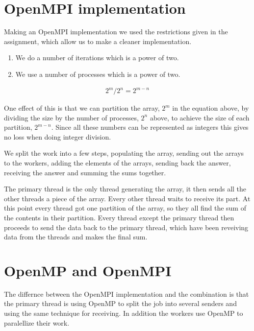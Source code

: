 \section{OpenMPI implementation }
Making an OpenMPI implementation we used the restrictions given in the assignment, which allow us to make a cleaner implementation. 

\begin{enumerate}

\item We do a number of iterations which is a power of two. 

\item We use a number of processes which is a power of two. 

\end{enumerate}

\begin{align}
2^{m}/2^{n} = 2^{m-n}
\end{align}

One effect of this is that we can partition the array, $2^{m}$ in the equation above, by dividing the size by the number of processes, $2^{n}$ above, to achieve the size of each partition, $2^{m-n}$. 
Since all these numbers can be represented as integers this gives no loss when doing integer division. 

We split the work into a few steps, populating the array, sending out the arrays to the workers, adding the elements of the arrays, sending back the answer, receiving the answer and summing the sums together. 

The primary thread is the only thread generating the array, it then sends all the other threads a piece of the array. 
Every other thread waits to receive its part. 
At this point every thread got one partition of the array, so they all find the sum of the contents in their partition. 
Every thread except the primary thread then proceeds to send the data back to the primary thread, which have been reveiving data from the threads and makes the final sum. 


\section{OpenMP and OpenMPI }
The differnce between the OpenMPI implementation and the combination is that the primary thread is using OpenMP to split the job into several senders and using the same technique for receiving. 
In addition the workers use OpenMP to paralellize their work. 



